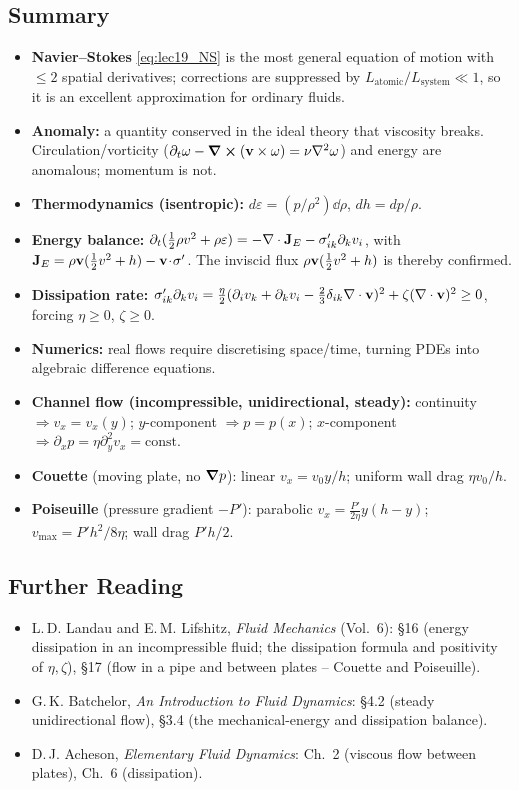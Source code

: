 \documentclass[../main.tex]{subfiles}
\begin{document}
\subsection*{Summary}
\begin{itemize}
  \item \textbf{Navier--Stokes} \eqref{eq:lec19_NS} is the most general equation of motion with $\le2$ spatial derivatives; corrections are suppressed by $L_{\text{atomic}}/L_{\text{system}}\ll1$, so it is an excellent approximation for ordinary fluids.
  \item \textbf{Anomaly:} a quantity conserved in the ideal theory that viscosity breaks. Circulation/vorticity ($\partial_t\mathbf{\omega}-\curl(\mathbf{v}\times\mathbf{\omega})=\nu\nabla^2\mathbf{\omega}$) and energy are anomalous; momentum is not.
  \item \textbf{Thermodynamics (isentropic):} $d\varepsilon=(p/\rho^2)\dd{\rho}$, $dh=dp/\rho$.
  \item \textbf{Energy balance:} $\partial_t(\tfrac12\rho v^2+\rho\varepsilon)=-\nabla \cdot\mathbf{J}_E-\sigma'_{ik}\partial_k v_i$, with $\mathbf{J}_E=\rho\mathbf{v}(\tfrac12 v^2+h)-\mathbf{v}\!\cdot\!\sigma'$. The inviscid flux $\rho\mathbf{v}(\tfrac12 v^2+h)$ is thereby confirmed.
  \item \textbf{Dissipation rate:} $\sigma'_{ik}\partial_k v_i=\tfrac{\eta}{2}(\partial_iv_k+\partial_kv_i-\tfrac23\delta_{ik}\nabla \cdot\mathbf{v})^2+\zeta(\nabla \cdot\mathbf{v})^2\ge0$, forcing $\eta\ge0$, $\zeta\ge0$.
  \item \textbf{Numerics:} real flows require discretising space/time, turning PDEs into algebraic difference equations.
  \item \textbf{Channel flow (incompressible, unidirectional, steady):} continuity $\Rightarrow v_x=v_x(y)$; $y$-component $\Rightarrow p=p(x)$; $x$-component $\Rightarrow\partial_x p=\eta\partial_y^2 v_x=\text{const}$.
  \item \textbf{Couette} (moving plate, no $\grad p$): linear $v_x=v_0 y/h$; uniform wall drag $\eta v_0/h$.
  \item \textbf{Poiseuille} (pressure gradient $-P'$): parabolic $v_x=\tfrac{P'}{2\eta}y(h-y)$; $v_{\max}=P'h^2/8\eta$; wall drag $P'h/2$.
\end{itemize}

\subsection*{Further Reading}
\begin{itemize}
  \item L.\,D. Landau and E.\,M. Lifshitz, \textit{Fluid Mechanics} (Vol.\ 6): \S16 (energy dissipation in an incompressible fluid; the dissipation formula and positivity of $\eta,\zeta$), \S17 (flow in a pipe and between plates -- Couette and Poiseuille).
  \item G.\,K. Batchelor, \textit{An Introduction to Fluid Dynamics}: \S4.2 (steady unidirectional flow), \S3.4 (the mechanical-energy and dissipation balance).
  \item D.\,J. Acheson, \textit{Elementary Fluid Dynamics}: Ch.\ 2 (viscous flow between plates), Ch.\ 6 (dissipation).
\end{itemize}
\end{document}
